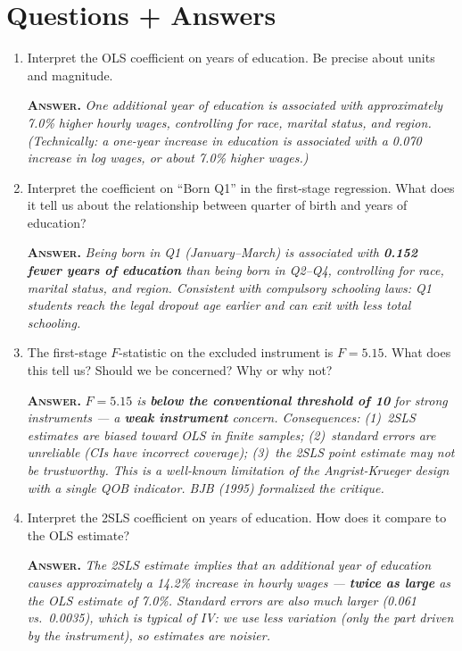\documentclass[11pt]{article}
\newcommand{\ans}[1]{%
  \vspace{2pt}%
  {\color{BrickRed}\textsc{\textbf{Answer.}}} {\itshape #1}\par\vspace{4pt}%
}
\begin{document}
\section*{Questions + Answers}

\begin{enumerate}

\item Interpret the OLS coefficient on years of education. Be precise about units and magnitude.

\ans{One additional year of education is associated with approximately 7.0\% higher hourly wages, controlling for race, marital status, and region. (Technically: a one-year increase in education is associated with a 0.070 increase in log wages, or about 7.0\% higher wages.)}

\item Interpret the coefficient on ``Born Q1'' in the first-stage regression. What does it tell us about the relationship between quarter of birth and years of education?

\ans{Being born in Q1 (January--March) is associated with \textbf{0.152 fewer years of education} than being born in Q2--Q4, controlling for race, marital status, and region. Consistent with compulsory schooling laws: Q1 students reach the legal dropout age earlier and can exit with less total schooling.}

\item The first-stage $F$-statistic on the excluded instrument is $F = 5.15$. What does this tell us? Should we be concerned? Why or why not?

\ans{$F = 5.15$ is \textbf{below the conventional threshold of 10} for strong instruments --- a \textbf{weak instrument} concern. Consequences: (1)~2SLS estimates are biased toward OLS in finite samples; (2)~standard errors are unreliable (CIs have incorrect coverage); (3)~the 2SLS point estimate may not be trustworthy. This is a well-known limitation of the Angrist-Krueger design with a single QOB indicator. BJB (1995) formalized the critique.}

\item Interpret the 2SLS coefficient on years of education. How does it compare to the OLS estimate?

\ans{The 2SLS estimate implies that an additional year of education \textit{causes} approximately a 14.2\% increase in hourly wages --- \textbf{twice as large} as the OLS estimate of 7.0\%. Standard errors are also much larger (0.061 vs.\ 0.0035), which is typical of IV: we use less variation (only the part driven by the instrument), so estimates are noisier.}


\end{enumerate}
\end{document}

